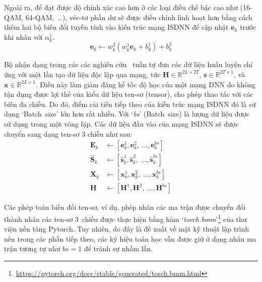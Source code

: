 Ngoài ra, để đạt được độ chính xác cao hơn ở các loại điều chế bậc cao như (16-QAM, 64-QAM,~\ldots), véc-tơ phần dư sẽ được điều chỉnh linh hoạt hơn bằng cách thêm hai bộ biến đổi tuyến tính vào kiến trúc mạng ISDNN để cập nhật $\mathbf{e}_k$ trước khi nhân với $\alpha^1_k$.
\begin{equation}
\mathbf{e}_k \leftarrow w^2_{k}\left(w^1_{k} \mathbf{e}_k+b^1_{k}\right)+b^2_{k}
\end{equation}

Bộ nhận dạng trong các các nghiên cứu~\cite{Mandloi2017, Liao2020, Samuel2019} tuần tự đưa các dữ liệu huấn luyện chỉ ứng với một lần tạo dữ liệu độc lập qua mạng, tức $\mathbf{H} \in \mathbb{R}^{2L \times 2T}$, $\mathbf{s} \in \mathbb{R}^{2T \times 1}$, và $\mathbf{x} \in \mathbb{R}^{2L \times 1}$. Điều này làm giảm đáng kể tốc độ học của một mạng DNN do không tận dụng được lợi thế của kiểu dữ liệu ten-sơ (tensor), cho phép thao tác với các biến đa chiều. Do đó, điểm cải tiến tiếp theo của kiến trúc mạng ISDNN đó là sử dụng `Batch~size' lớn hơn rất nhiều. Với `\textit{bs}' (Batch~size) là lượng dữ liệu được sử dụng trong một vòng lặp. Các dữ liệu đầu vào của mạng ISDNN sẽ được chuyển sang dạng ten-sơ $3$ chiều như sau:
\begin{subequations}
    \begin{align}
        \mathbf{E}_k &\leftarrow [\mathbf{e}_k^1, \mathbf{e}_k^2,~\ldots, \mathbf{e}_k^{bs}]\\
        \hat{\mathbf{S}}_k &\leftarrow [\hat{\mathbf{s}}_k^1, \hat{\mathbf{s}}_k^2,~\ldots, \hat{\mathbf{s}}_k^{bs}] \\
        \mathbf{X}_k &\leftarrow [\mathbf{x}_k^1, \mathbf{x}_k^2,~\ldots, \mathbf{x}_k^{bs}] \\
        \mathbf{H}   &\leftarrow [\mathbf{H}^1, \mathbf{H}^2,~\ldots, \mathbf{H}^{bs}]  
    \end{align}
\end{subequations}

Các phép toán biến đổi ten-sơ, ví dụ, phép nhân các ma trận được chuyển đổi thành nhân các ten-sơ $3$~chiều được thực hiện bằng hàm `\textit{torch.bmm}'\footnote{\url{https://pytorch.org/docs/stable/generated/torch.bmm.html}} của thư viện nền tảng Pytorch. Tuy nhiên, do đây là đề xuất về mặt kỹ thuật lập trình nên trong các phần tiếp theo, các ký hiệu toán học vẫn được giữ ở dạng nhân ma trận tương tự như $bs = 1$ để tránh sự nhầm lẫn.

